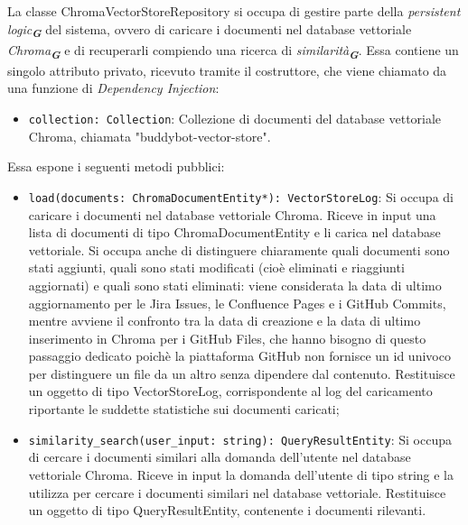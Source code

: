 \label{sec:chroma_vector_store_repository}
La classe ChromaVectorStoreRepository si occupa di gestire parte della \emph{persistent logic}\textsubscript{\textbf{\textit{G}}} del sistema, ovvero di caricare i documenti nel database vettoriale \emph{Chroma}\textsubscript{\textbf{\textit{G}}} e di recuperarli compiendo una ricerca di \emph{similarità}\textsubscript{\textbf{\textit{G}}}. Essa contiene un singolo attributo privato, ricevuto tramite il costruttore, che viene chiamato da una funzione di \emph{Dependency Injection}:
\begin{itemize}
    \item \texttt{collection: Collection}: Collezione di documenti del database vettoriale Chroma, chiamata "buddybot-vector-store".
\end{itemize}
Essa espone i seguenti metodi pubblici:
\begin{itemize}
    \item \texttt{load(documents: ChromaDocumentEntity*): VectorStoreLog}: Si occupa di caricare i documenti nel database vettoriale Chroma. Riceve in input una lista di documenti di tipo ChromaDocumentEntity e li carica nel database vettoriale. Si occupa anche di distinguere chiaramente quali documenti sono stati aggiunti, quali sono stati modificati (cioè eliminati e riaggiunti aggiornati) e quali sono stati eliminati: viene considerata la data di ultimo aggiornamento per le Jira Issues, le Confluence Pages e i GitHub Commits, mentre avviene il confronto tra la data di creazione e la data di ultimo inserimento in Chroma per i GitHub Files, che hanno bisogno di questo passaggio dedicato poichè la piattaforma GitHub non fornisce un id univoco per distinguere un file da un altro senza dipendere dal contenuto. Restituisce un oggetto di tipo VectorStoreLog, corrispondente al log del caricamento riportante le suddette statistiche sui documenti caricati;
    \item \texttt{similarity\_search(user\_input: string): QueryResultEntity}: Si occupa di cercare i documenti similari alla domanda dell'utente nel database vettoriale Chroma. Riceve in input la domanda dell'utente di tipo string e la utilizza per cercare i documenti similari nel database vettoriale. Restituisce un oggetto di tipo QueryResultEntity, contenente i documenti rilevanti.
\end{itemize}

